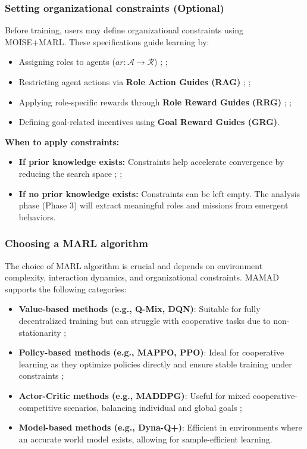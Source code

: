 \documentclass[pdflatex,sn-mathphys-num]{sn-jnl}%
\theoremstyle{thmstyleone}%
\theoremstyle{thmstyletwo}%
\theoremstyle{thmstylethree}%
\begin{document}
\subsubsection{Setting organizational constraints (Optional)}
Before training, users may define organizational constraints using MOISE+MARL. These specifications guide learning by:
\begin{itemize}
    \item Assigning roles to agents ($ar: \mathcal{A} \to \mathcal{R}$) ; ;
    \item Restricting agent actions via \textbf{Role Action Guides (RAG)} ; ;
    \item Applying role-specific rewards through \textbf{Role Reward Guides (RRG)} ; ;
    \item Defining goal-related incentives using \textbf{Goal Reward Guides (GRG)}.
\end{itemize}

\noindent \textbf{When to apply constraints:}
\begin{itemize}
    \item \textbf{If prior knowledge exists:} Constraints help accelerate convergence by reducing the search space ; ;
    \item \textbf{If no prior knowledge exists:} Constraints can be left empty. The analysis phase (Phase 3) will extract meaningful roles and missions from emergent behaviors.
\end{itemize}

\subsubsection{Choosing a MARL algorithm}
The choice of MARL algorithm is crucial and depends on environment complexity, interaction dynamics, and organizational constraints. MAMAD supports the following categories:

\begin{itemize}
    \item \textbf{Value-based methods (e.g., Q-Mix, DQN)}: Suitable for fully decentralized training but can struggle with cooperative tasks due to non-stationarity ;
    \item \textbf{Policy-based methods (e.g., MAPPO, PPO)}: Ideal for cooperative learning as they optimize policies directly and ensure stable training under constraints ;
    \item \textbf{Actor-Critic methods (e.g., MADDPG)}: Useful for mixed cooperative-competitive scenarios, balancing individual and global goals ;
    \item \textbf{Model-based methods (e.g., Dyna-Q+)}: Efficient in environments where an accurate world model exists, allowing for sample-efficient learning.
\end{itemize}
\end{document}
